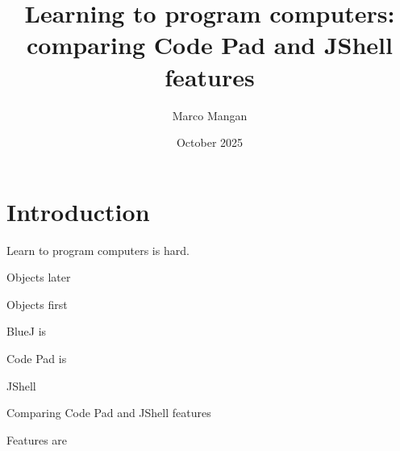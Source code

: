 \documentclass{article}
\title{Learning to program computers: comparing Code Pad and JShell features}
\author{Marco Mangan}
\date{October 2025}
\begin{document}
\maketitle

\section{Introduction}

Learn to program computers is hard. 

Objects later

Objects first

BlueJ is

Code Pad is

JShell

Comparing Code Pad and JShell features

Features are
\end{document}
